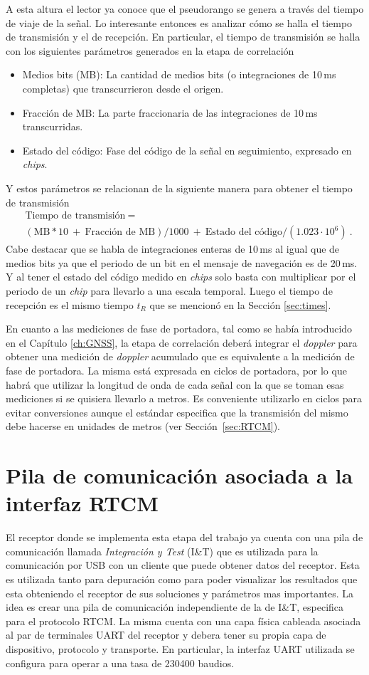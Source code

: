 \documentclass[a4paper,12pt,oneside,onecolumn,final,openright]{book}%
\begin{document}
	A esta altura el lector ya conoce que el pseudorango se genera a través del tiempo de viaje de la señal. Lo interesante entonces es analizar cómo se halla el tiempo de transmisión y el de recepción. En particular, el tiempo de transmisión se halla con los siguientes parámetros generados en la etapa de correlación
\begin{itemize}
	\item Medios bits (MB): La cantidad de medios bits (o integraciones de 10\,ms completas) que transcurrieron desde el origen. 
	\item Fracción de MB: La parte fraccionaria de las integraciones de 10\,ms transcurridas.
	\item Estado del código: Fase del código de la señal en seguimiento, expresado en \textit{chips}.
\end{itemize}
	Y estos parámetros se relacionan de la siguiente manera para obtener el tiempo de transmisión
\begin{align}
	&\text{Tiempo de transmisión} \ = \\ &\left(\text{MB}*10 \ + \ \text{Fracción de MB} \right)/1000 \ + \ \text{Estado del código}/(1.023\cdot 10^6) \ \nonumber.
\end{align}
	Cabe destacar que se habla de integraciones enteras de 10\,ms al igual que de medios bits ya que el periodo de un bit en el mensaje de navegación es de 20\,ms. Y al tener el estado del código medido en \textit{chips} solo basta con multiplicar por el periodo de un \textit{chip} para llevarlo a una escala temporal. Luego el tiempo de recepción es el mismo tiempo $t_R$ que se mencionó en la Sección \ref{sec:times}.
	
	En cuanto a las mediciones de fase de portadora, tal como se había introducido en el Capítulo \ref{ch:GNSS}, la etapa de correlación deberá integrar el \textit{doppler} para obtener una medición de \textit{doppler} acumulado que es equivalente a la medición de fase de portadora. La misma está expresada en ciclos de portadora, por lo que habrá que utilizar la longitud de onda de cada señal con la que se toman esas mediciones si se quisiera llevarlo a metros. Es conveniente utilizarlo en ciclos para evitar conversiones aunque el estándar especifica que la transmisión del mismo debe hacerse en unidades de metros (ver Sección~\ref{sec:RTCM}).
\section{Pila de comunicación asociada a la interfaz RTCM}
	El receptor donde se implementa esta etapa del trabajo ya cuenta con una pila de comunicación llamada \textit{Integración y Test} (I\&T) que es utilizada para la comunicación por USB con un cliente que puede obtener datos del receptor. Esta es utilizada tanto para depuración como para poder visualizar los resultados que esta obteniendo el receptor de sus soluciones y parámetros mas importantes. La idea es crear una pila de comunicación independiente de la de I\&T, especifica para el protocolo RTCM. La misma cuenta con una capa física cableada asociada al par de terminales UART del receptor y debera tener su propia capa de dispositivo, protocolo y transporte. En particular, la interfaz UART utilizada se configura para operar a una tasa de 230400 baudios. 
	
\end{document}
